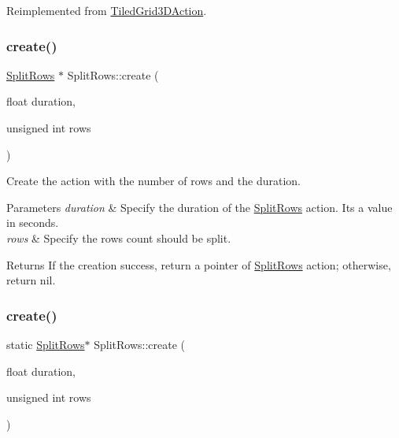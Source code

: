 Reimplemented from \hyperlink{classTiledGrid3DAction_a689fd377cc0abae91db7def106529b53}{Tiled\+Grid3\+D\+Action}.

\mbox{\label{classSplitRows_a9294734acb0eff668b1bec51b7b8ac5a}} 
\subsubsection{\texorpdfstring{create()}{create()}\hspace{0.1cm}{\footnotesize\ttfamily [1/2]}}
{\footnotesize\ttfamily \hyperlink{classSplitRows}{Split\+Rows} $\ast$ Split\+Rows\+::create (\begin{DoxyParamCaption}\item[{float}]{duration,  }\item[{unsigned int}]{rows }\end{DoxyParamCaption})\hspace{0.3cm}{\ttfamily [static]}}



Create the action with the number of rows and the duration. 


\begin{DoxyParams}{Parameters}
{\em duration} & Specify the duration of the \hyperlink{classSplitRows}{Split\+Rows} action. It\textquotesingle{}s a value in seconds. \\
\hline
{\em rows} & Specify the rows count should be split. \\
\hline
\end{DoxyParams}
\begin{DoxyReturn}{Returns}
If the creation success, return a pointer of \hyperlink{classSplitRows}{Split\+Rows} action; otherwise, return nil. 
\end{DoxyReturn}
\mbox{\label{classSplitRows_a4e451beaa043480dae11975d9c5947e8}} 
\subsubsection{\texorpdfstring{create()}{create()}\hspace{0.1cm}{\footnotesize\ttfamily [2/2]}}
{\footnotesize\ttfamily static \hyperlink{classSplitRows}{Split\+Rows}$\ast$ Split\+Rows\+::create (\begin{DoxyParamCaption}\item[{float}]{duration,  }\item[{unsigned int}]{rows }\end{DoxyParamCaption})\hspace{0.3cm}{\ttfamily [static]}}



